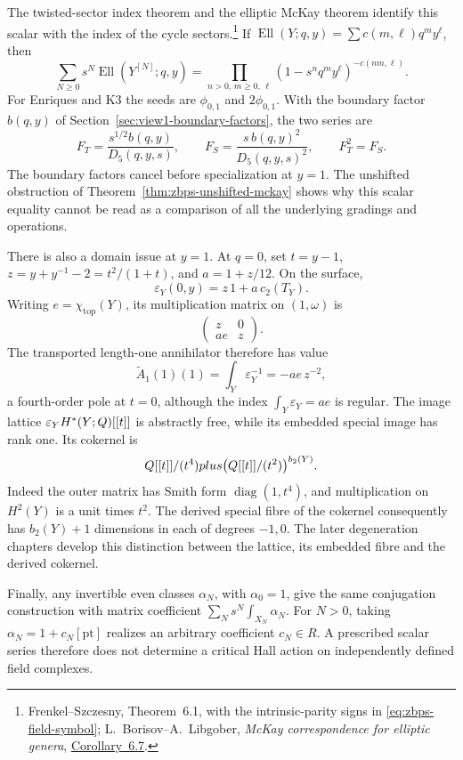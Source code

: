 The twisted-sector index theorem and the elliptic McKay theorem
identify this scalar with the index of the cycle sectors.\footnote{
Frenkel--Szczesny, Theorem~6.1, with the intrinsic-parity signs in
\eqref{eq:zbps-field-symbol}; L.~Borisov--A.~Libgober,
\emph{McKay correspondence for elliptic genera},
\href{https://arxiv.org/abs/math/0206241}{Corollary~6.7}.}
If \(\operatorname{Ell}(Y;q,y)=\sum c(m,\ell)q^my^\ell\), then
\[
 \sum_{N\ge0}s^N\operatorname{Ell}(Y^{[N]};q,y)
 =\prod_{n>0,\,m\ge0,\,\ell}
       (1-s^nq^my^\ell)^{-c(nm,\ell)}.
\]
For Enriques and K3 the seeds are \(\phi_{0,1}\) and
\(2\phi_{0,1}\).  With the boundary factor \(b(q,y)\) of
Section~\ref{sec:view1-boundary-factors}, the two series are
\[
 F_T=\frac{s^{1/2}b(q,y)}{D_5(q,y,s)},\qquad
 F_S=\frac{s\,b(q,y)^2}{D_5(q,y,s)^2},\qquad F_T^2=F_S.
\]
The boundary factors cancel before specialization at \(y=1\).
The unshifted obstruction of Theorem~\ref{thm:zbps-unshifted-mckay}
shows why this scalar equality cannot be read as a comparison of
all the underlying gradings and operations.

There is also a domain issue at \(y=1\).  At \(q=0\), set
\(t=y-1\), \(z=y+y^{-1}-2=t^2/(1+t)\), and
\(a=1+z/12\).  On the surface,
\[
 \varepsilon_Y(0,y)=z\,1+a\,c_2(T_Y).
\]
Writing \(e=\chi_{\mathrm{top}}(Y)\), its multiplication matrix
on \((1,\omega)\) is
\[
 \begin{pmatrix}z&0\\ae&z\end{pmatrix}.
\]
The transported length-one annihilator therefore has value
\[
 \widetilde A_1(1)(1)=\int_Y\varepsilon_Y^{-1}=-ae\,z^{-2},
\]
a fourth-order pole at \(t=0\), although the index
\(\int_Y\varepsilon_Y=ae\) is regular.  The image lattice
\(\varepsilon_Y H^*(Y;Q)[[t]]\) is abstractly free, while its
embedded special image has rank one.  Its cokernel is
\[
 Q[[t]]/(t^4)plus
       \bigl(Q[[t]]/(t^2)\bigr)^{b_2(Y)}.
\]
Indeed the outer matrix has Smith form \(\operatorname{diag}(1,t^4)\),
and multiplication on \(H^2(Y)\) is a unit times \(t^2\).
The derived special fibre of the cokernel consequently has
\(b_2(Y)+1\) dimensions in each of degrees \(-1,0\).
The later degeneration chapters develop this distinction between
the lattice, its embedded fibre and the derived cokernel.

Finally, any invertible even classes \(\alpha_N\), with
\(\alpha_0=1\), give the same conjugation construction with
matrix coefficient \(\sum_Ns^N\int_{X_N}\alpha_N\).
For \(N>0\), taking \(\alpha_N=1+c_N[\mathrm{pt}]\) realizes
an arbitrary coefficient \(c_N\in R\).  A prescribed scalar
series therefore does not determine a critical Hall action on
independently defined field complexes.


